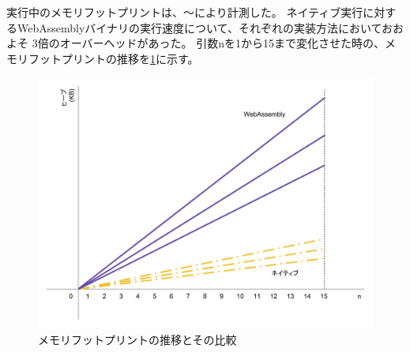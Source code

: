 実行中のメモリフットプリントは、〜により計測した。
ネイティブ実行に対するWebAssemblyバイナリの実行速度について、それぞれの実装方法においておおよそ
3倍のオーバーヘッドがあった。
引数nを1から15まで変化させた時の、メモリフットプリントの推移を\ref{fig:heap_size}に示す。

\begin{figure}[htbp]
  \caption{メモリフットプリントの推移とその比較}
  \label{fig:heap_size}
  \begin{center}
    \includegraphics[bb=0 0 800 600,width=12cm]{img/heap_size.pdf}
  \end{center}
\end{figure}
